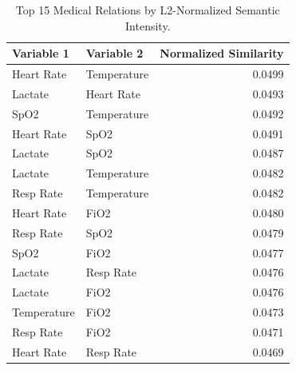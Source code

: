 \begin{table}
\caption{Top 15 Medical Relations by L2-Normalized Semantic Intensity.}
\label{tab:semantic_relations}
\begin{tabular}{llr}
\toprule
Variable 1 & Variable 2 & Normalized Similarity \\
\midrule
Heart Rate & Temperature & 0.0499 \\
Lactate & Heart Rate & 0.0493 \\
SpO2 & Temperature & 0.0492 \\
Heart Rate & SpO2 & 0.0491 \\
Lactate & SpO2 & 0.0487 \\
Lactate & Temperature & 0.0482 \\
Resp Rate & Temperature & 0.0482 \\
Heart Rate & FiO2 & 0.0480 \\
Resp Rate & SpO2 & 0.0479 \\
SpO2 & FiO2 & 0.0477 \\
Lactate & Resp Rate & 0.0476 \\
Lactate & FiO2 & 0.0476 \\
Temperature & FiO2 & 0.0473 \\
Resp Rate & FiO2 & 0.0471 \\
Heart Rate & Resp Rate & 0.0469 \\
\bottomrule
\end{tabular}
\end{table}
